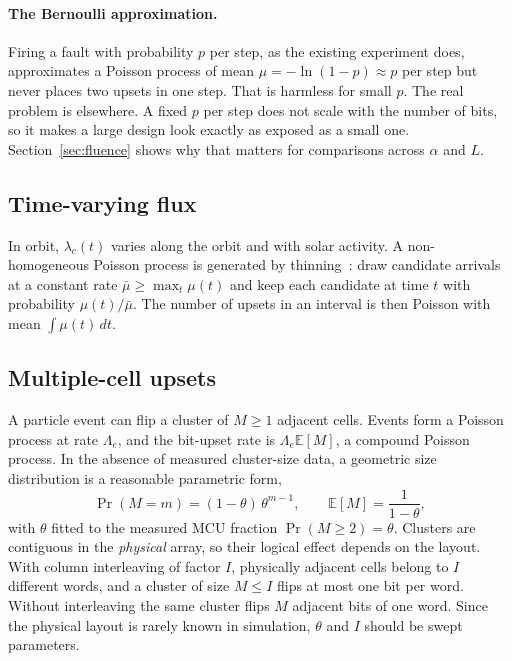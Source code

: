 \documentclass[11pt,a4paper]{article}
\newcommand{\E}{\mathbb{E}}
\begin{document}
\paragraph{The Bernoulli approximation.} Firing a fault with probability $p$ per step, as the existing experiment does, approximates a Poisson process of mean $\mu = -\ln(1-p) \approx p$ per step but never places two upsets in one step. That is harmless for small $p$. The real problem is elsewhere. A fixed $p$ per step does not scale with the number of bits, so it makes a large design look exactly as exposed as a small one. Section~\ref{sec:fluence} shows why that matters for comparisons across $\alpha$ and $L$.

\subsection{Time-varying flux}

In orbit, $\lambda_c(t)$ varies along the orbit and with solar activity. A non-homogeneous Poisson process is generated by thinning~\cite{lewis1979}: draw candidate arrivals at a constant rate $\bar\mu \ge \max_t \mu(t)$ and keep each candidate at time $t$ with probability $\mu(t)/\bar\mu$. The number of upsets in an interval is then Poisson with mean $\int \mu(t)\,dt$.

\subsection{Multiple-cell upsets}
\label{sec:mcu}

A particle event can flip a cluster of $M \ge 1$ adjacent cells. Events form a Poisson process at rate $\Lambda_e$, and the bit-upset rate is $\Lambda_e \E[M]$, a compound Poisson process. In the absence of measured cluster-size data, a geometric size distribution is a reasonable parametric form,
\begin{equation}
\Pr(M = m) = (1-\theta)\, \theta^{m-1}, \qquad \E[M] = \frac{1}{1-\theta},
\end{equation}
with $\theta$ fitted to the measured MCU fraction $\Pr(M \ge 2) = \theta$. Clusters are contiguous in the \emph{physical} array, so their logical effect depends on the layout. With column interleaving of factor $I$, physically adjacent cells belong to $I$ different words, and a cluster of size $M \le I$ flips at most one bit per word. Without interleaving the same cluster flips $M$ adjacent bits of one word. Since the physical layout is rarely known in simulation, $\theta$ and $I$ should be swept parameters.
\end{document}
